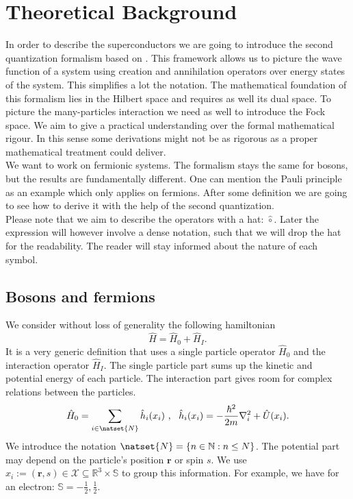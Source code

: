\documentclass[../main.tex]{subfile}
\begin{document}
\section{Theoretical Background}
In order to describe the superconductors we are going to introduce the second quantization formalism based on \cite{Folk2014}.
This framework allows us to picture the wave function of a system using creation and annihilation operators over
energy states of the system. This simplifies a lot the notation. The mathematical foundation of this formalism lies
in the Hilbert space and requires as well its dual space. To picture the many-particles interaction we need as well
to introduce the Fock space. We aim to give a practical understanding over the formal mathematical rigour.
In this sense some derivations might not be as rigorous as a proper mathematical treatment could deliver.\\

We want to work on fermionic systems. The formalism stays the same for 
bosons, but the results are fundamentally different. One can mention the Pauli principle as an example which
only applies on fermions. After some definition we are going to see how to derive it with the help of the second quantization.\\ 

Please note that we aim to describe the operators with a hat: $\hat{\circ}$.
Later the expression will however involve a dense notation, such that we will drop the hat for the readability. The reader will stay
informed about the nature of each symbol. \\

\subsection{Bosons and fermions}
We consider without loss of generality the following hamiltonian
\begin{equation}\label{eq:MasterHamiltonian}
    \hat{H} = \hat{H}_0 + \hat{H}_I.
\end{equation}
It is a very generic definition that uses a single particle operator $\hat{H}_0$ and the interaction operator $\hat{H}_I$. The single 
particle part sums up the kinetic and potential energy of each particle. The interaction part gives room for complex relations
between the particles.\\ 
\[
    \hat{H}_0 = \sum_{i\in \natset{N}} \hat{h}_i(x_i)~,~~ \hat{h}_i(x_i) = -\frac{\hbar^2}{2m}\nabla_i^2 + \hat{U}(x_i).
\]
We introduce the notation $\natset{N} = \{n \in \mathbb{N}: n\leq N\}$. The potential part may depend on the particle's position $\bm{r}$ or spin $s$. 
We use $x_i := (\bm{r}, s) \in \mathcal{X}\subseteq\mathbb{R}^{3}\times\mathbb{S}$ to group this information. For example, we have for an electron:
$\mathbb{S}= {-\frac{1}{2},\frac{1}{2}}$.\\
\end{document}
